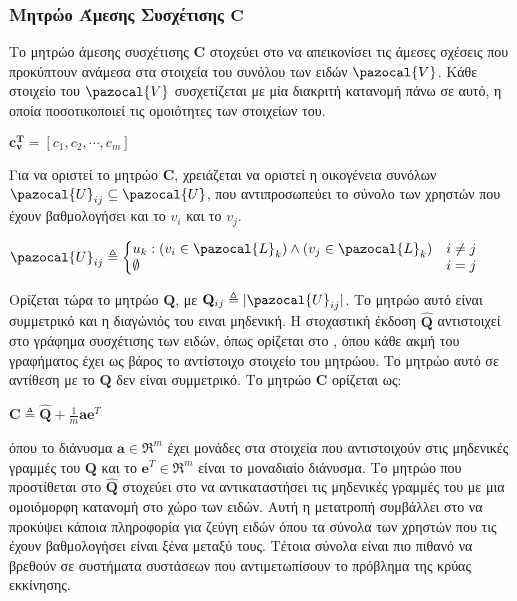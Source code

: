 \subsubsection{Μητρώο Άμεσης Συσχέτισης $\mathbf{C}$}
Το μητρώο άμεσης συσχέτισης $\mathbf{C}$ στοχεύει στο να απεικονίσει τις άμεσες σχέσεις που προκύπτουν ανάμεσα στα στοιχεία του συνόλου των ειδών $\pazocal{V}$. Κάθε στοιχείο του $\pazocal{V}$ συσχετίζεται με μία διακριτή κατανομή πάνω σε αυτό, η οποία ποσοτικοποιεί τις ομοιότητες των στοιχείων του. 
\begin{center}
$\mathbf{c_\mathbf{v}^T} = [c_1, c_2, \cdots, c_m]$
\end{center}
Για να οριστεί το μητρώο $\mathbf{C}$, χρειάζεται να οριστεί η οικογένεια συνόλων $\pazocal{U}_{ij} \subseteq \pazocal{U}$, που αντιπροσωπεύει το σύνολο των χρηστών που έχουν βαθμολογήσει και το $v_i$ και το $v_j$. 
\begin{center}
$\pazocal{U}_{ij} \triangleq \left\{
    \begin{array}{@{} l c @{}}
      u_k : (v_i \in \pazocal{L}_k) \wedge (v_j \in \pazocal{L}_k) & i \neq j \\
      \emptyset & i = j
    \end{array}\right.$
\end{center}
Ορίζεται τώρα το μητρώο $\mathbf{Q}$, με $\mathbf{Q}_{ij} \triangleq |\pazocal{U}_{ij}|$. Το μητρώο αυτό είναι συμμετρικό και η διαγώνιός του ειναι μηδενική. Η στοχαστική έκδοση $\mathbf{\hat{Q}}$ αντιστοιχεί στο γράφημα συσχέτισης των ειδών, όπως ορίζεται στο \cite{Gori:2007:IRB:1625275.1625720}, όπου κάθε ακμή του γραφήματος έχει ως βάρος το αντίστοιχο στοιχείο του μητρώου. Το μητρώο αυτό σε αντίθεση με το $\mathbf{Q}$ δεν είναι συμμετρικό. Το μητρώο $\mathbf{C}$ ορίζεται ως:
\begin{center}
$\mathbf{C} \triangleq \mathbf{\hat{Q}} + \frac{1}{m}\mathbf{a}\mathbf{e}^T$
\end{center}
όπου το διάνυσμα $\mathbf{a} \in \Re^m$ έχει μονάδες στα στοιχεία που αντιστοιχούν στις μηδενικές γραμμές του $\mathbf{Q}$ και το $\mathbf{e}^T \in \Re^m$ είναι το μοναδιαίο διάνυσμα. Το μητρώο που προστίθεται στο $\mathbf{\hat{Q}}$ στοχεύει στο να αντικαταστήσει τις μηδενικές γραμμές του με μια ομοιόμορφη κατανομή στο χώρο των ειδών. Αυτή η μετατροπή συμβάλλει στο να προκύψει κάποια πληροφορία για ζεύγη ειδών όπου τα σύνολα των χρηστών που τις έχουν βαθμολογήσει είναι ξένα μεταξύ τους. Τέτοια σύνολα είναι πιο πιθανό να βρεθούν σε συστήματα συστάσεων που αντιμετωπίσουν το πρόβλημα της κρύας εκκίνησης. 
